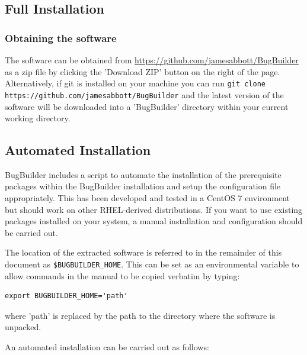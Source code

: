 \documentclass[a4paper,10pt]{article}
\begin{document}
\subsection{Full Installation}

\subsubsection{Obtaining the software}

The software can be obtained from
\url{https://github.com/jamesabbott/BugBuilder} as a zip file by clicking the
'Download ZIP' button on the right of the page. Alternatively, if git is
installed on your machine you can run {\tt git clone
https://github.com/jamesabbott/BugBuilder} and the latest version of the
software will be downloaded into a 'BugBuilder' directory within your current
working directory.

\subsection{Automated Installation}\label{sec:autoinstall}

BugBuilder includes a script to automate the installation of the prerequisite
packages within the BugBuilder installation and setup the configuration file
appropriately. This has been developed and tested in a CentOS 7 environment but
should work on other RHEL-derived distributions. If you want to use existing
packages installed on your system, a manual installation and configuration
should be carried out.

The location of the extracted software is referred to in the remainder of this
document as {\tt \$BUGBUILDER\_HOME}. This can be set as an environmental
variable to allow commands in the manual to be copied verbatim by typing:

\begin{verbatim}export BUGBUILDER_HOME='path'\end{verbatim}

where 'path' is replaced by the path to the directory where the software is unpacked.

An automated installation can be carried out as follows:
\end{document}
